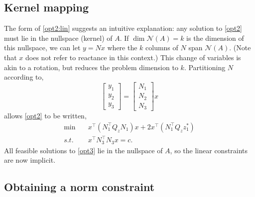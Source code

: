 \documentclass[conference]{IEEEtran}
\begin{document}
\subsection{Kernel mapping}

The form of \eqref{opt2:lin} suggests an intuitive explanation: any
solution to \eqref{opt2} must lie in the nullspace (kernel) of $A$. If
$\dim \mathcal{N}(A) =k$ is the dimension of this nullspace, we can
let $y=Nx$ where the $k$ columns of $N$ span $\mathcal{N}(A)$. (Note
that $x$ does not refer to reactance in this context.) This change of
variables is akin to a rotation, but reduces the problem dimension to
$k$. Partitioning $N$ according to,
\[
\begin{bmatrix} y_1 \\ y_2 \\ y_3 \end{bmatrix} = \begin{bmatrix} N_1
  \\ N_2 \\ N_3 \end{bmatrix} x
\]
allows \eqref{opt2} to be written,
\begin{subequations}\label{opt3}
\begin{align}
\label{opt3:obj} \min\quad  &x^\top (N_1^\top Q_zN_1) x + 2x^\top
(N_1^\top Q_zz_1^*) \\
\label{opt3:quad} s.t.\quad &x^\top N_3^\top N_3 x = c.
\end{align}
\end{subequations}
All feasible solutions to \eqref{opt3} lie in the nullspace of $A$, so
the linear constraints are now implicit.

\subsection{Obtaining a norm constraint}
\end{document}
